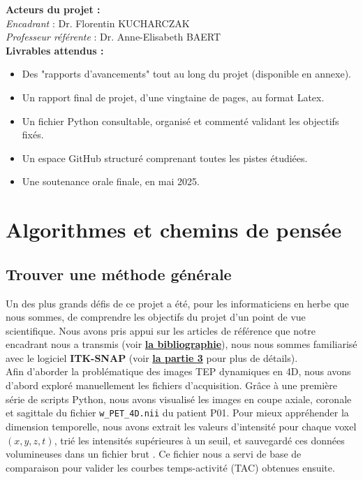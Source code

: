 \documentclass[a4paper]{article}
\begin{document}
    
    \noindent\textbf{Acteurs du projet :}\\
    \textit{Encadrant} : Dr. Florentin KUCHARCZAK\\
    \textit{Professeur référente} : Dr. Anne-Elisabeth BAERT\\
    
    \noindent\textbf{Livrables attendus :}
    \begin{itemize}
        \item Des "rapports d'avancements" tout au long du projet (disponible en annexe).
        \item Un rapport final de projet, d'une vingtaine de pages, au format Latex.
        \item Un fichier Python consultable, organisé et commenté validant les objectifs fixés.
        \item Un espace GitHub structuré comprenant toutes les pistes étudiées.
        \item Une soutenance orale finale, en mai 2025.\\
    \end{itemize}


\newpage
\section{Algorithmes et chemins de pensée}
    \subsection{Trouver une méthode générale}
            \noindent
            \label{sec:intro}
            Un des plus grands défis de ce projet a été, pour les informaticiens en herbe que nous sommes, de comprendre les objectifs du projet d’un point de vue scientifique. Nous avons pris appui sur les articles de référence que notre encadrant nous a transmis (voir \hyperref[bibliographie]{\textbf{la bibliographie}}), nous nous sommes familiarisé avec le logiciel \textbf{ITK-SNAP} (voir \hyperref[sec:Outils]{\textbf{la partie 3}} pour plus de détails).\\
            
            \noindent
            Afin d’aborder la problématique des images TEP dynamiques en 4D, nous avons d’abord exploré manuellement les fichiers d’acquisition. Grâce à une première série de scripts Python, nous avons visualisé les images en coupe axiale, coronale et sagittale du fichier \texttt{w\_PET\_4D.nii} du patient P01. Pour mieux appréhender la dimension temporelle, nous avons extrait les valeurs d’intensité pour chaque voxel $(x, y, z, t)$, trié les intensités supérieures à un seuil, et sauvegardé ces données volumineuses dans un fichier brut . Ce fichier nous a servi de base de comparaison pour valider les courbes temps-activité (TAC) obtenues ensuite.\\
            
\end{document}
